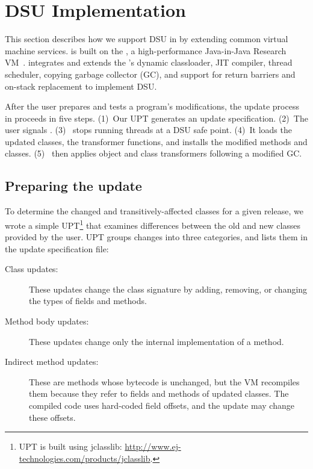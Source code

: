 

\section{\DSU{} DSU Implementation}
\label{sec:vm}

This section describes how we support DSU in \DSU{} by extending
common virtual machine services.  \DSU{} is built on the
\JikesRVM{},
a high-performance Java-in-Java Research VM~\cite{AAB+:99,VMperf:webpage}.
\DSU{} integrates and extends the \JikesRVM{}'s dynamic classloader,
JIT compiler, thread scheduler, copying garbage collector (GC), and
support for return barriers and on-stack replacement to implement DSU\@.  


After the user prepares and tests a program's modifications, the
update process in \DSU{} proceeds in five steps. 
(1)~Our UPT generates an update specification.  
(2)~The user signals \DSU{}.  (3)~\DSU{} stops running threads at a DSU safe point. (4)~It loads the
updated classes, the transformer functions,
and installs the modified methods and classes. (5)~\DSU{} then
applies object and class transformers following a modified GC\@.

\subsection{Preparing the update}
\label{sec:prep}

To determine the changed and transitively-affected classes for a given
release, we wrote a simple \acf{UPT}\footnote{\ac{UPT} is built using
jclasslib: \url{http://www.ej-technologies.com/products/jclasslib}.} that examines differences between
the old and new classes provided by the user.
\ac{UPT} groups changes into three categories, and lists them in the
update specification file:

\begin{description}
\item[Class updates:] These updates change the class signature by
  add\-ing, removing, or changing the types of fields and methods.
\item[Method body updates:] These updates change only the internal
implementation of a method. 
\item[Indirect method updates:] These are methods whose bytecode is
  unchanged, but the VM recompiles them because they
  refer to fields and methods of updated classes.   The compiled
  code uses hard-coded field offsets, and the update may change these offsets.
\end{description}


